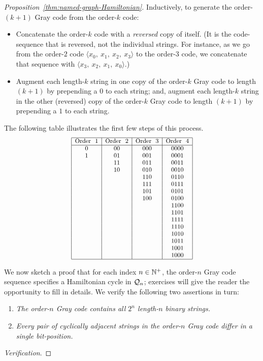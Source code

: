\begin{proof}[Proposition~\ref{thm:named-graph-Hamiltonian}]
Inductively, to generate the order-$(k+1)$ Gray code from the order-$k$ code:
\begin{itemize}
\item
Concatenate the order-$k$ code with a {\em reversed} copy of itself.
(It is the code-sequence that is reversed, not the individual strings.
For instance, as we go from the order-$2$ code $\langle x_0, \ x_1,
\ x_2, \ x_3 \rangle$ to the order-$3$ code, we concatenate that
sequence with $\langle x_3, \ x_2, \ x_1, \ x_0 \rangle$.)
\item
Augment each length-$k$ string in one copy of the order-$k$ Gray code
to length $(k+1)$ by prepending a $0$ to each string; and, augment
each length-$k$ string in the other (reversed) copy of the order-$k$
Gray code to length $(k+1)$ by prepending a $1$ to each string.
\end{itemize}
The following table illustrates the first few steps of this process.
\begin{equation}
\label{eq:gray-code}
 {\small
\begin{array}{|c|c|c|c|}
\hline
\mbox{Order } \ 1
  & \mbox{Order } \ 2
  & \mbox{Order } \ 3
  & \mbox{Order } \ 4 \\
\hline
0   & 00   & 000  &  0000 \\ 
1   & 01   & 001  &  0001 \\
    & 11   & 011  &  0011 \\
    & 10   & 010  &  0010 \\
    &      & 110  &  0110 \\
    &      & 111  &  0111 \\
    &      & 101  &  0101 \\
    &      & 100  &  0100 \\
    &      &      &  1100 \\  
    &      &      &  1101 \\  
    &      &      &  1111 \\  
    &      &      &  1110 \\  
    &      &      &  1010 \\  
    &      &      &  1011 \\  
    &      &      &  1001 \\  
    &      &      &  1000 \\  
\hline
\end{array} }
\end{equation}

We now sketch a proof that for each index $n \in \mathbb{N}^+$, the order-$n$ Gray code sequence
specifies a Hamiltonian cycle in $\mbox{$\cal Q$}_n$; exercises will give the reader the opportunity to fill 
in details.  We verify the following two assertions in turn:
\begin{enumerate}
\item
{\it The order-$n$ Gray code contains all $2^n$ length-$n$ binary strings.}
\item
{\it Every pair of cyclically adjacent strings in the order-$n$ Gray code differ in a single bit-position.}
\end{enumerate}
{\it Verification}.


\end{proof}
